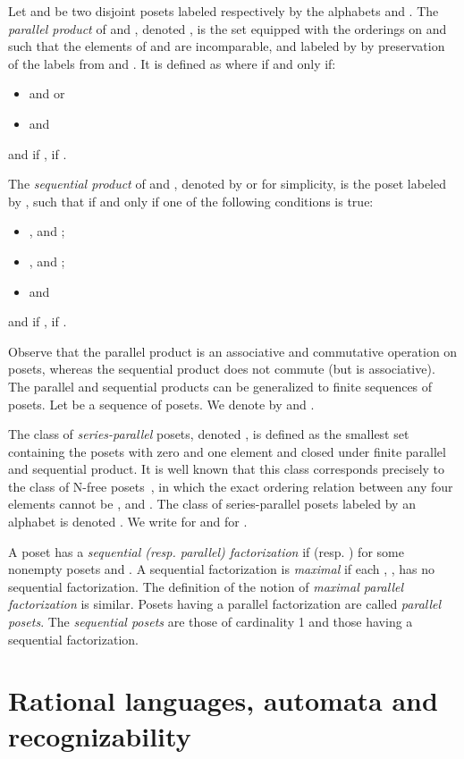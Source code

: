 \documentclass{CSML}
\begin{document}
Let  and  be two disjoint posets labeled respectively by the alphabets  and .
The \emph{parallel product} of  and , denoted , is the set  equipped with the orderings on  and  such that the elements of  and  are incomparable, and labeled by  by preservation of the labels from  and . 
It is defined as  where  if and only if:
\begin{itemize}
\item  and  or
\item  and 
\end{itemize}
and  if ,  if .

The \emph{sequential product} of  and , denoted by  or  for simplicity, is the poset  labeled by , such that  if and only if one of the following conditions is true:
\begin{itemize}
\item ,  and ;
\item ,  and ;
\item  and 
\end{itemize}
and  if ,  if .

Observe that the parallel product is an associative and commutative operation on posets, whereas the sequential product does not commute (but is associative). 
The parallel and sequential products can be generalized to finite sequences of posets. Let  be a sequence of posets. We denote by  and .

The class of \emph{series-parallel} posets, denoted , is defined as the smallest set containing the posets with zero and one element and closed under finite parallel and sequential product. It is well known that this class corresponds precisely to the class of N-free posets~\cite{Val78,VTL82:SPDigraphs}, in which the exact ordering relation between any four elements  cannot be ,  and . The class of series-parallel posets labeled by an alphabet  is denoted . We write  for  and  for .

A poset  has a \emph{sequential (resp. parallel) factorization} if  (resp. ) for some nonempty posets  and . A sequential factorization  is \emph{maximal} if each , , has no sequential factorization. The definition of the notion of \emph{maximal parallel factorization} is similar. Posets having a parallel factorization are called \emph{parallel posets}. The \emph{sequential posets} are those of cardinality 1 and those having a sequential factorization.

\section{Rational languages, automata and recognizability}
\label{sec:languages}
\end{document}
